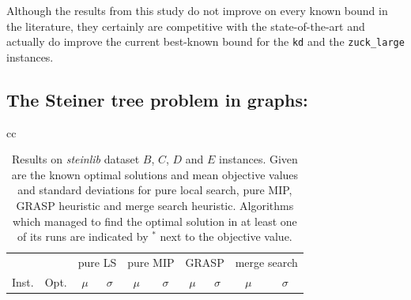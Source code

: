 \documentclass[authoryear,11pt,square,number,times,super,comma]{elsarticle}
\newcommand{\zucklarge}{\texttt{zuck\_large}}
\newcommand{\dmine}{\texttt{kd}}
\newcommand{\opt}[1]{#1\textbf{\(^*\)}}
\begin{document}
Although the results from this study do not improve on every known bound in the literature, they certainly are competitive with the state-of-the-art and actually do improve the current best-known bound for the \dmine{} and the \zucklarge{} instances.

\subsection{The Steiner tree problem in graphs:}

\begin{table}[h]
\centering
\caption[Results on \emph{steinlib} dataset \(B\) instances]{Results on \emph{steinlib} dataset \(B\), \(C\), \(D\) and \(E\) instances. Given are the known optimal solutions and mean objective values and standard deviations for pure local search, pure MIP, GRASP heuristic and merge search heuristic. Algorithms which managed to find the optimal solution in at least one of its runs are indicated by \opt{} next to the objective value.}\label{tab:stpg:results}
\begin{tabular}{cc}
\centering
\begin{adjustbox}{width=0.48\textwidth}
\begin{tabular}{lrrrrrrrrr} \toprule
 &  & \multicolumn{2}{c}{pure LS} & \multicolumn{2}{c}{pure MIP} & \multicolumn{2}{c}{GRASP} & \multicolumn{2}{c}{merge search}\\
\cmidrule(lr){3-4} \cmidrule(lr){5-6} \cmidrule(lr){7-8} \cmidrule(lr){9-10} 
Inst. & Opt. & \multicolumn{1}{c}{\(\mu\)}&\multicolumn{1}{c}{\(\sigma\)} & \multicolumn{1}{c}{\(\mu\)}&\multicolumn{1}{c}{\(\sigma\)}& \multicolumn{1}{c}{\(\mu\)}&\multicolumn{1}{c}{\(\sigma\)} & \multicolumn{1}{c}{\(\mu\)}&\multicolumn{1}{c}{\(\sigma\)}\\ \midrule
%

%
\bottomrule
\end{tabular}

\end{adjustbox}
\end{tabular}
\end{table}
\end{document}
